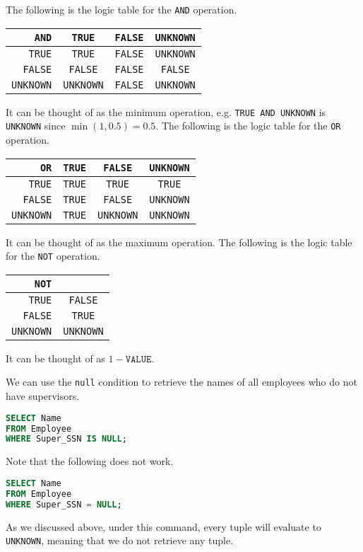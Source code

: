 \documentclass[a4paper, openany]{memoir}
\begin{document}
The following is the logic table for the \texttt{AND} operation.
\begin{table}[H]
    \centering
    \begin{tabular}{r|ccc}
        \texttt{AND} & \texttt{TRUE} & \texttt{FALSE} & \texttt{UNKNOWN} \\
        \hline
        \texttt{TRUE} & \texttt{TRUE} & \texttt{FALSE}& \texttt{UNKNOWN} \\
        \texttt{FALSE} & \texttt{FALSE} & \texttt{FALSE} & \texttt{FALSE} \\
        \texttt{UNKNOWN} & \texttt{UNKNOWN} & \texttt{FALSE} & \texttt{UNKNOWN}
    \end{tabular}
\end{table}
\noindent It can be thought of as the minimum operation, e.g. \texttt{TRUE AND UNKNOWN} is \texttt{UNKNOWN} since $\min(1, 0.5) = 0.5$. The following is the logic table for the \texttt{OR} operation.
\begin{table}[H]
    \centering
    \begin{tabular}{r|ccc}
        \texttt{OR} & \texttt{TRUE} & \texttt{FALSE} & \texttt{UNKNOWN} \\
        \hline
        \texttt{TRUE} & \texttt{TRUE} & \texttt{TRUE}& \texttt{TRUE} \\
        \texttt{FALSE} & \texttt{TRUE} & \texttt{FALSE} & \texttt{UNKNOWN} \\
        \texttt{UNKNOWN} & \texttt{TRUE} & \texttt{UNKNOWN} & \texttt{UNKNOWN}
    \end{tabular}
\end{table}
\noindent It can be thought of as the maximum operation. The following is the logic table for the \texttt{NOT} operation.
\begin{table}[H]
    \centering
    \begin{tabular}{r|c}
        \texttt{NOT} &  \\
        \hline
        \texttt{TRUE} & \texttt{FALSE} \\
        \texttt{FALSE} & \texttt{TRUE} \\
        \texttt{UNKNOWN} & \texttt{UNKNOWN}
    \end{tabular}
\end{table}
\noindent It can be thought of as $1 - \texttt{VALUE}$.

We can use the \texttt{null} condition to retrieve the names of all employees who do not have supervisors.
\begin{lstlisting}[language=SQL]
SELECT Name
FROM Employee
WHERE Super_SSN IS NULL;
\end{lstlisting}
Note that the following does not work.
\begin{lstlisting}[language=SQL]
SELECT Name
FROM Employee
WHERE Super_SSN = NULL;
\end{lstlisting}
As we discussed above, under this command, every tuple will evaluate to \texttt{UNKNOWN}, meaning that we do not retrieve any tuple.
\newpage
\end{document}
